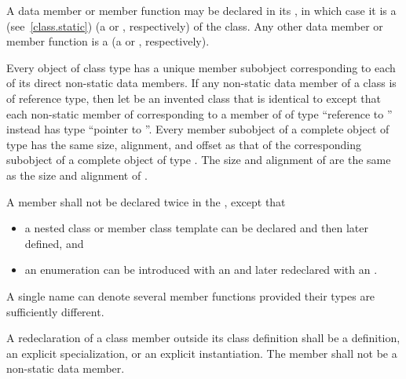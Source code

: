 \pnum
A data member or member function
may be declared  in its ,
in which case it is a  (see~\ref{class.static})
(a  or
, respectively)
of the class.
Any other data member or member function is a 
(a  or
, respectively).

\pnum
Every object of class type has a unique member subobject
corresponding to each of its direct non-static data members.
If any non-static data member of a class  is of reference type,
then let  be an invented class
that is identical to 
except that each non-static member of  corresponding to
a member of  of type ``reference to ''
instead has type ``pointer to ''.
Every member subobject of a complete object of type 
has the same size, alignment, and offset
as that of the corresponding subobject of a complete object of type .
The size and alignment of  are the same as
the size and alignment of .

\pnum
A member shall not be declared twice in the
, except that
\begin{itemize}
\item a nested class or member
class template can be declared and then later defined, and
\item an
enumeration can be introduced with an  and later
redeclared with an .
\end{itemize}
\begin{note}
A single name can denote several member functions provided their types
are sufficiently different.
\end{note}

\pnum
A redeclaration of a class member outside its class definition shall be
a definition,
an explicit specialization, or
an explicit instantiation.
The member shall not be a non-static data member.

